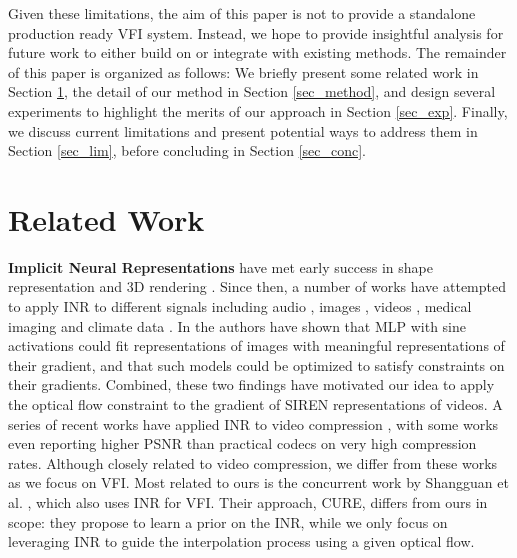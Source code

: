 \documentclass{article}
\begin{document}

Given these limitations, the aim of this paper is not to provide a standalone production ready VFI system.
Instead, we hope to provide insightful analysis for future work to either build on or integrate with existing methods.
The remainder of this paper is organized as follows:
We briefly present some related work in Section \ref{sec_related},
the detail of our method in Section \ref{sec_method},
and design several experiments to highlight the merits of our approach in Section \ref{sec_exp}.
Finally, we discuss current limitations and present potential ways to address them in Section \ref{sec_lim},
before concluding in Section \ref{sec_conc}.

\section{Related Work}
\label{sec_related}

\textbf{ Implicit Neural Representations} have met early success in
shape representation and 3D rendering \cite{park2019deepsdf} \cite{mescheder2019occupancy} \cite{mildenhall2020nerf}.
Since then, a number of works have attempted to
apply INR to different signals including audio \cite{sitzmann2020implicit} \cite{kim2022learning}, images \cite{dupont2021coin} \cite{dupont2022coin++}, videos \cite{chen2021nerv} \cite{shangguan2022learning} \cite{rho2022neural},
medical imaging and climate data \cite{dupont2022coin++}.
In \cite{sitzmann2020implicit} the authors have shown that MLP with sine activations
could fit representations of images with meaningful representations of their gradient,
and that such models could be optimized to satisfy constraints on their gradients.
Combined, these two findings have motivated our idea to apply the optical
flow constraint to the gradient of SIREN representations of videos.
A series of recent works have applied INR to video compression \cite{zhang2021implicit} \cite{chen2021nerv} ,
with some works \cite{chen2021nerv} even reporting higher PSNR
than practical codecs on very high compression rates.
Although closely related to video compression,
we differ from these works as we focus on VFI.
Most related to ours is the concurrent work by Shangguan et al. \cite{shangguan2022learning}, which also uses INR for VFI.
Their approach, CURE, differs from ours in scope:
they propose to learn a prior on the INR,
while we only focus on leveraging INR to guide the interpolation process using a given optical flow.
\end{document}
